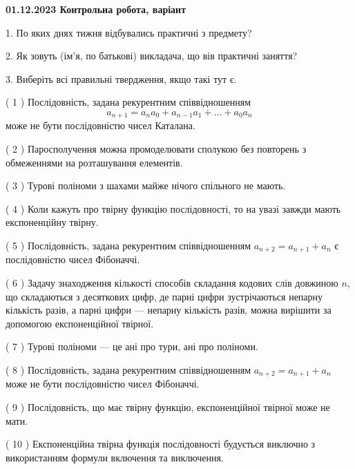 \documentclass[12pt, ukrainian]{article}
\begin{document}
\vspace{4mm}
\newpage
\begin {large}

\textbf{01.12.2023 Контрольна робота, варіант  }\par


{
1. По яких днях тижня відбувались практичні з предмету?



\vspace{5mm}
2. Як зовуть (ім'я, по батькові) викладача, що вів практичні заняття?



\vspace{5mm}
3. Виберіть всі правильні твердження, якщо такі тут є.\par
\vspace{2mm}
( 1 ) Послідовність, задана рекурентним співвідношенням $$a_{n+1}=a_{n}a_{0}+a_{n-1}a_{1}+\ldots+a_0a_{n}$$ може не бути послідовністю чисел Каталана.%

( 2 ) Паросполучення можна промоделювати сполукою без повторень з обмеженнями на розташування елементів.%

( 3 ) Турові поліноми з шахами майже нічого спільного не мають.%

( 4 ) Коли кажуть про твірну функцію послідовності, то на увазі завжди мають експоненційну твірну.%

( 5 ) Послідовність, задана рекурентним співвідношенням $a_{n+2}=a_{n+1}+a_{n}$ є послідовністю чисел Фібоначчі.%

( 6 ) Задачу знаходження кількості способів складання кодових слів довжиною $n$, що складаються з десяткових цифр, де парні цифри зустрічаються непарну кількість разів, а парні цифри — непарну кількість разів, можна вирішити за допомогою експоненційної твірної.%

( 7 ) Турові поліноми --- це ані про тури, ані про поліноми.%

( 8 ) Послідовність, задана рекурентним співвідношенням $a_{n+2}=a_{n+1}+a_{n}$ може не бути послідовністю чисел Фібоначчі.%

( 9 ) Послідовність, що має твірну функцію, експоненційної твірної може не мати.%

( 10 ) Експоненційна твірна функція послідовності будується виключно з використанням формули включення та виключення.%
}
\end {large}
\end{document}
